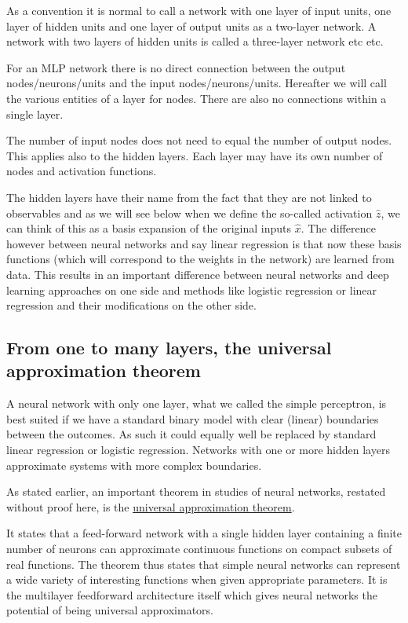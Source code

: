 \documentclass[%
oneside,                 %
final,                   %
10pt]{article}
\begin{document}
\noindent
As a convention it is normal to call  a  network with one layer of input units, one layer of hidden
units and one layer of output units as  a two-layer network. A network with two layers of hidden units is called a three-layer network etc etc.

For an MLP network there is no direct connection between the output nodes/neurons/units and  the input nodes/neurons/units.
Hereafter we will call the various entities of a layer for nodes.
There are also no connections within a single layer.

The number of input nodes does not need to equal the number of output
nodes. This applies also to the hidden layers. Each layer may have its
own number of nodes and activation functions.

The hidden layers have their name from the fact that they are not
linked to observables and as we will see below when we define the
so-called activation $\hat{z}$, we can think of this as a basis
expansion of the original inputs $\hat{x}$. The difference however
between neural networks and say linear regression is that now these
basis functions (which will correspond to the weights in the network)
are learned from data. This results in  an important difference between
neural networks and deep learning approaches on one side and methods
like logistic regression or linear regression and their modifications on the other side.

\subsection{From one to many layers, the universal approximation theorem}

A neural network with only one layer, what we called the simple
perceptron, is best suited if we have a standard binary model with
clear (linear) boundaries between the outcomes. As such it could
equally well be replaced by standard linear regression or logistic
regression. Networks with one or more hidden layers approximate
systems with more complex boundaries.

As stated earlier, 
an important theorem in studies of neural networks, restated without
proof here, is the \href{{http://citeseerx.ist.psu.edu/viewdoc/download?doi=10.1.1.441.7873&rep=rep1&type=pdf}}{universal approximation
theorem}.

It states that a feed-forward network with a single hidden layer
containing a finite number of neurons can approximate continuous
functions on compact subsets of real functions. The theorem thus
states that simple neural networks can represent a wide variety of
interesting functions when given appropriate parameters. It is the
multilayer feedforward architecture itself which gives neural networks
the potential of being universal approximators.
\end{document}
